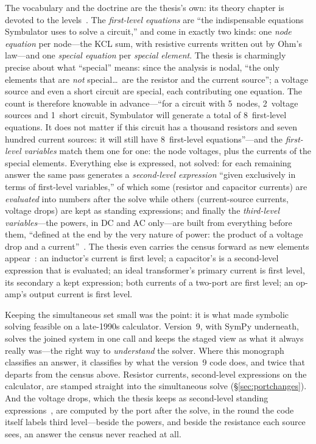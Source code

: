 \documentclass[11pt,oneside]{report}
\begin{document}
The vocabulary and the doctrine are the thesis's own: its theory
chapter is devoted to the levels~\cite[\S4.2]{thesis2000}. The
\emph{first-level equations} are ``the indispensable equations
Symbulator uses to solve a circuit,'' and come in exactly two kinds:
one \emph{node equation} per node---the KCL sum, with resistive
currents written out by Ohm's law---and one \emph{special equation}
per \emph{special element}. The thesis is charmingly precise about
what ``special'' means: since the analysis is nodal, ``the only
elements that are \emph{not} special\ldots\ are the resistor and the
current source''; a voltage source and even a short circuit are
special, each contributing one equation. The count is therefore
knowable in advance---``for a circuit with 5~nodes, 2~voltage
sources and 1~short circuit, Symbulator will generate a total of
8~first-level equations. It does not matter if this circuit has a
thousand resistors and seven hundred current sources: it will still
have 8~first-level equations''---and the \emph{first-level
variables} match them one for one: the node voltages, plus the
currents of the special elements. Everything else is expressed, not
solved: for each remaining answer the same pass generates a
\emph{second-level expression} ``given exclusively in terms of
first-level variables,'' of which some (resistor and capacitor
currents) are \emph{evaluated} into numbers after the solve while
others (current-source currents, voltage drops) are kept as standing
expressions; and finally the \emph{third-level variables}---the
powers, in DC and AC only---are built from everything before them,
``defined at the end by the very nature of power: the product of a
voltage drop and a current''~\cite[\S4.2.6]{thesis2000}. The thesis
even carries the census forward as new elements
appear~\cite[\S9.4.3]{thesis2000}: an inductor's current is first
level; a capacitor's is a second-level expression that is evaluated;
an ideal transformer's primary current is first level, its secondary
a kept expression; both currents of a two-port are first level; an
op-amp's output current is first level.

Keeping the simultaneous set small was the point: it is what made
symbolic solving feasible on a late-1990s calculator. Version~9, with
SymPy underneath, solves the joined system in one call and keeps the
staged view as what it always really was---the right way to
\emph{understand} the solver. Where this monograph classifies an
answer, it classifies by what the version~9 code does, and twice
that departs from the census above. Resistor currents, second-level
expressions on the calculator, are stamped straight into the
simultaneous solve (\S\ref{sec:portchanges}). And the voltage
drops, which the thesis keeps as second-level standing
expressions~\cite[\S4.2.4]{thesis2000}, are computed by the port
after the solve, in the round the code itself labels third
level---beside the powers, and beside the resistance each source
sees, an answer the census never reached at all.
\end{document}
